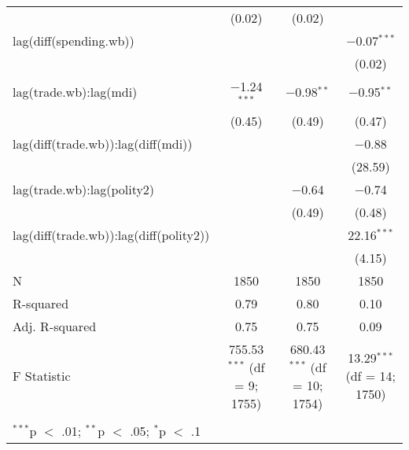 \begin{table}[!htbp]
\begin{tabular}{@{\extracolsep{5pt}}lccc}
  & (0.02) & (0.02) &  \\ 
  lag(diff(spending.wb)) &  &  & $-$0.07$^{***}$ \\ 
  &  &  & (0.02) \\ 
  lag(trade.wb):lag(mdi) & $-$1.24$^{***}$ & $-$0.98$^{**}$ & $-$0.95$^{**}$ \\ 
  & (0.45) & (0.49) & (0.47) \\ 
  lag(diff(trade.wb)):lag(diff(mdi)) &  &  & $-$0.88 \\ 
  &  &  & (28.59) \\ 
  lag(trade.wb):lag(polity2) &  & $-$0.64 & $-$0.74 \\ 
  &  & (0.49) & (0.48) \\ 
  lag(diff(trade.wb)):lag(diff(polity2)) &  &  & 22.16$^{***}$ \\ 
  &  &  & (4.15) \\ 
 N & 1850 & 1850 & 1850 \\ 
R-squared & 0.79 & 0.80 & 0.10 \\ 
Adj. R-squared & 0.75 & 0.75 & 0.09 \\ 
F Statistic & 755.53$^{***}$ (df = 9; 1755) & 680.43$^{***}$ (df = 10; 1754) & 13.29$^{***}$ (df = 14; 1750) \\ 
\hline \\[-1.8ex] 
\multicolumn{4}{l}{$^{***}$p $<$ .01; $^{**}$p $<$ .05; $^{*}$p $<$ .1} \\ 
\end{tabular} 
\end{table} 
